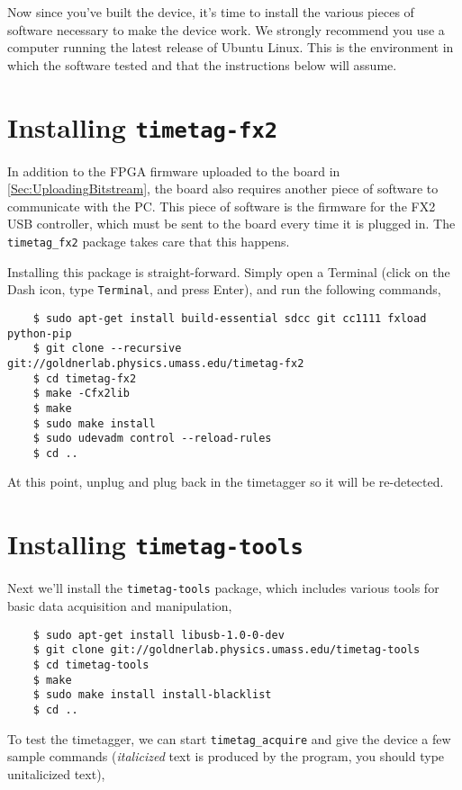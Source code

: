 Now since you've built the device, it's time to install the various
pieces of software necessary to make the device work. We strongly
recommend you use a computer running the latest release of Ubuntu
Linux. This is the environment in which the software tested and that
the instructions below will assume.

\section{Installing {\tt timetag-fx2}}
In addition to the FPGA firmware uploaded to the board in
\ref{Sec:UploadingBitstream}, the board also requires another piece of
software to communicate with the PC. This piece of software is the
firmware for the FX2 USB controller, which must be sent to the board
every time it is plugged in. The {\tt timetag\_fx2} package takes care
that this happens.

Installing this package is straight-forward. Simply open a Terminal
(click on the Dash icon, type {\tt Terminal}, and press Enter), and
run the following commands,

\begin{verbatim}
    $ sudo apt-get install build-essential sdcc git cc1111 fxload python-pip
    $ git clone --recursive git://goldnerlab.physics.umass.edu/timetag-fx2
    $ cd timetag-fx2
    $ make -Cfx2lib
    $ make
    $ sudo make install
    $ sudo udevadm control --reload-rules
    $ cd ..
\end{verbatim}

At this point, unplug and plug back in the timetagger so it will be
re-detected.

\section{Installing {\tt timetag-tools}}

Next we'll install the {\tt timetag-tools} package, which includes
various tools for basic data acquisition and manipulation,

\begin{verbatim}
    $ sudo apt-get install libusb-1.0-0-dev
    $ git clone git://goldnerlab.physics.umass.edu/timetag-tools
    $ cd timetag-tools
    $ make
    $ sudo make install install-blacklist
    $ cd ..
\end{verbatim}

To test the timetagger, we can start {\tt timetag\_acquire} and give
the device a few sample commands ({\it italicized} text is produced by
the program, you should type unitalicized text),


